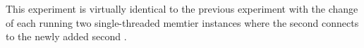         This experiment is virtually identical to the previous experiment with the change of each \srv{} running two
        single-threaded memtier instances where the second connects to the newly added second \mw{}.

        \begin{figure}
            \vspace*{-.5\baselineskip}
\end{figure}
